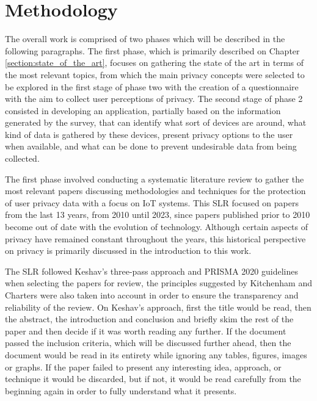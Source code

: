 %
%
\section{Methodology} \label{section:methodology}

The overall work is comprised of two phases which will be described
in the following paragraphs. The first phase, which is primarily described
on Chapter \ref{section:state_of_the_art}, focuses on gathering the state
of the art in terms of the most relevant topics, from which the main privacy
concepts were selected to be explored in the first stage of phase two with
the creation of a questionnaire with the aim to collect user perceptions
of privacy. The second stage of phase 2 consisted in developing an
application, partially based on the information generated by the survey,
that can identify what sort of devices are around, what kind of data is
gathered by these devices, present privacy options to the user when available,
and what can be done to prevent undesirable data from being collected.
\par
The first phase involved conducting a systematic literature review to gather
the most relevant papers discussing methodologies and techniques for the
protection of user privacy data with a focus on IoT systems. This SLR focused
on papers from the last 13 years, from 2010 until 2023, since papers
published prior to 2010 become out of date with the evolution of technology.
Although certain aspects of privacy have remained constant throughout the years,
this historical perspective on privacy is primarily discussed in the
introduction to this work.

The SLR followed Keshav's three-pass approach \cite{KeshavHow} and
PRISMA 2020 \cite{pagen2021prisma} guidelines when selecting the papers
for review, the principles suggested by Kitchenham and Charters \cite{kitchenham2007guidelines}
were also taken into account in order to ensure the transparency and
reliability of the review. On Keshav's approach, first the title would
be read, then the abstract, the introduction and conclusion and briefly
skim the rest of the paper and then decide if it was worth reading any
further. If the document passed the inclusion criteria, which will be
discussed further ahead, then the document would be read in its entirety
while ignoring any tables, figures, images or graphs. If the paper failed
to present any interesting idea, approach, or technique it would be discarded,
but if not, it would be read carefully from the beginning again in order
to fully understand what it presents.

